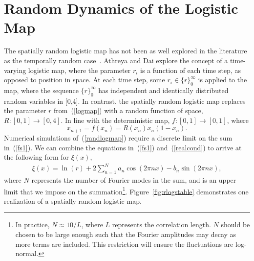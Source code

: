 \section{Random Dynamics of the Logistic Map}
The spatially random logistic map has not been as well explored in the
literature as the temporally random case~\cite{athreya}. Athreya and
Dai explore the concept of a time-varying logistic map, where the
parameter $r_i$ is a function of each time step, as opposed to position
in space. At each time step, some $r_i \in \{r\}_0^\infty$ is applied
to the map, where the
sequence $\{r\}_0^\infty$ has independent and identically distributed
random variables in [0,4]. In contrast, the spatially random logistic
map replaces the parameter $r$ from~(\ref{logmap}) with a random
function of space, $R:[0,1]\to [0,4]$. In line with the deterministic map, 
$f:[0,1]\to [0,1]$, where
\begin{equation}\label{randlogmap}
x_{n+1} = f(x_n) = R(x_n)x_n(1-x_n).
\end{equation}
Numerical simulations of~(\ref{randlogmap}) require a discrete limit
on the sum in~(\ref{fs1}). We can combine
the equations in~(\ref{fs1}) and~(\ref{realcond}) to arrive at the following form for
$\xi(x)$,
\begin{align}\label{fs2}
\xi(x) = \ln(r) + 2\sum^N_{n=1}a_n\cos(2\pi nx)-b_n\sin(2\pi nx),
\end{align}
where $N$ represents the number of Fourier modes in the sum, and is an
upper limit that we impose on the summation\footnote{In practice, $N
  \approx 10/L$, where $L$ represents the correlation length. $N$
  should be chosen to be large enough such that the Fourier amplitudes
may decay as more terms are included. This restriction will ensure the
fluctuations are log-normal.}. Figure~\ref{fig:rlogstable} demonstrates one realization of a spatially random logistic map.
